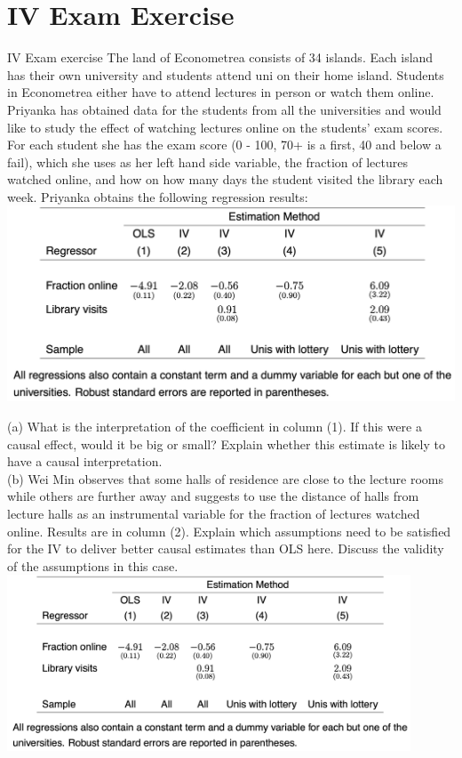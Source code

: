 \documentclass[11pt,xcolor=table]{beamer}
\begin{document}
\section{IV Exam Exercise}

\begin{frame}[allowframebreaks]{IV Exam exercise}
The land of Econometrea consists of 34 islands. Each island has their own university and students attend uni on their home island. Students in Econometrea either have to attend lectures in person or watch them online. Priyanka has obtained data for the students from all the universities and would like to study the effect of watching lectures online on the students’ exam scores. For each student she has the exam score (0 - 100, 70+ is a first, 40 and below a fail), which she uses as her left hand side variable, the fraction of lectures watched online, and how on how many days the student visited the library each week. Priyanka obtains the following regression results:\\

\framebreak 
\includegraphics[width=1.0\textwidth]{tables/IV_Table.png}

\framebreak
(a) What is the interpretation of the coefficient in column (1). If this were a causal effect, would it be big or small? Explain whether this estimate is likely to have a causal interpretation.\\

(b) Wei Min observes that some halls of residence are close to the lecture rooms while others are further away and suggests to use the distance of halls from lecture halls as an instrumental variable for the fraction of lectures watched online. Results are in column (2). Explain which assumptions need to be satisfied for the IV to deliver better causal estimates than OLS here. Discuss the validity of the assumptions in this case.
\framebreak 
\includegraphics[width=0.9\textwidth]{tables/IV_Table.png}
\framebreak


\end{frame}
\end{document}

